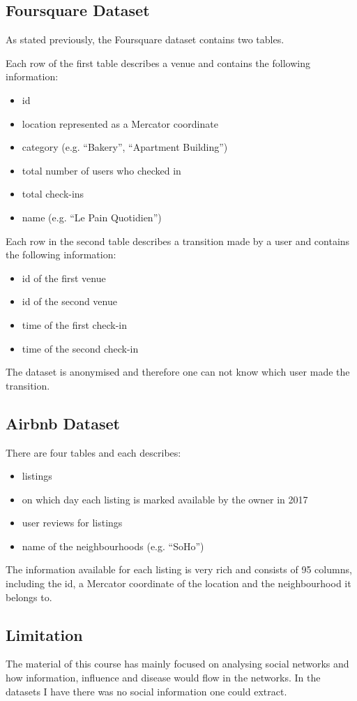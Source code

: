 \subsection{Foursquare Dataset}
As stated previously, the Foursquare dataset contains two tables.

Each row of the first table describes a venue and contains the following information:
\begin{itemize}
\item id
\item location represented as a Mercator coordinate
\item category (e.g. ``Bakery'', ``Apartment Building'')
\item total number of users who checked in
\item total check-ins
\item name (e.g. ``Le Pain Quotidien'')
\end{itemize}
Each row in the second table describes a transition made by a user and contains the following information:
\begin{itemize}
\item id of the first venue 
\item id of the second venue
\item time of the first check-in
\item time of the second check-in
\end{itemize}
The dataset is anonymised and therefore one can not know which user made the transition.
\subsection{Airbnb Dataset}
There are four tables and each describes:
\begin{itemize}
\item listings
\item on which day each listing is marked available by the owner in 2017
\item user reviews for listings
\item name of the neighbourhoods (e.g. ``SoHo'')
\end{itemize}
The information available for each listing is very rich and consists of 95 columns, including the id, a Mercator coordinate of the location and the neighbourhood it belongs to.

\subsection{Limitation}
The material of this course has mainly focused on analysing social networks and how information, influence and disease would flow in the networks. In the datasets I have there was no social information one could extract.

